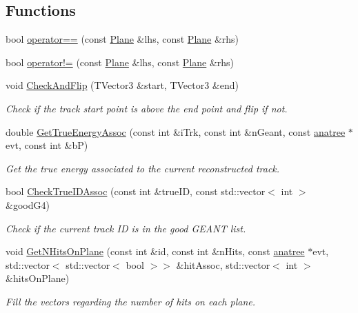 \subsection*{Functions}
\begin{DoxyCompactItemize}
\item 
bool \hyperlink{namespacecalib_a9604025cf44dd4b28cb671e126d143b4}{operator==} (const \hyperlink{classcalib_1_1Plane}{Plane} \&lhs, const \hyperlink{classcalib_1_1Plane}{Plane} \&rhs)
\item 
bool \hyperlink{namespacecalib_afda108ed03b328c3ae5dc9cdf23bac2d}{operator!=} (const \hyperlink{classcalib_1_1Plane}{Plane} \&lhs, const \hyperlink{classcalib_1_1Plane}{Plane} \&rhs)
\item 
void \hyperlink{namespacecalib_a856373d78738b9950df22f0d9fbe2d1b}{Check\-And\-Flip} (T\-Vector3 \&start, T\-Vector3 \&end)
\begin{DoxyCompactList}\small\item\em Check if the track start point is above the end point and flip if not. \end{DoxyCompactList}\item 
double \hyperlink{namespacecalib_a3e74469ecf9a8f68f8b3b29c5bf4d435}{Get\-True\-Energy\-Assoc} (const int \&i\-Trk, const int \&n\-Geant, const \hyperlink{classanatree}{anatree} $\ast$evt, const int \&b\-P)
\begin{DoxyCompactList}\small\item\em Get the true energy associated to the current reconstructed track. \end{DoxyCompactList}\item 
bool \hyperlink{namespacecalib_a7f422a36cfbc70f2c1613958be850d6b}{Check\-True\-I\-D\-Assoc} (const int \&true\-I\-D, const std\-::vector$<$ int $>$ \&good\-G4)
\begin{DoxyCompactList}\small\item\em Check if the current track I\-D is in the good G\-E\-A\-N\-T list. \end{DoxyCompactList}\item 
void \hyperlink{namespacecalib_a3fbdf602928f87de620d008cf655ee7c}{Get\-N\-Hits\-On\-Plane} (const int \&id, const int \&n\-Hits, const \hyperlink{classanatree}{anatree} $\ast$evt, std\-::vector$<$ std\-::vector$<$ bool $>$$>$ \&hit\-Assoc, std\-::vector$<$ int $>$ \&hits\-On\-Plane)
\begin{DoxyCompactList}\small\item\em Fill the vectors regarding the number of hits on each plane. \end{DoxyCompactList}\item 
$$
\end{DoxyCompactItemize}
